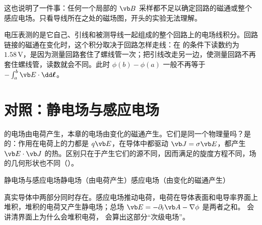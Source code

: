 这也说明了一件事：任何一个局部的 $\vb B$ 采样都不足以确定回路的磁通或整个感应电场。只看导线所在之处的磁场图，开头的实验无法理解。

\begin{pitfall}[“电压表测的就是两点之间的电势差”]
电压表测的是它自己、引线和被测导线一起组成的整个回路上的电场线积分。回路链接的磁通在变化时，这个积分取决于回路怎样走线：在 的条件下读数约为 $1.58\,\mathrm V$，是因为测量回路套住了螺线管一次；把引线改走另一边，使测量回路不再套住螺线管，读数就会不同。此时 $\phi(b)-\phi(a)$ 一般不再等于 $-\int_a^b\vb E\cdot\dd\boldsymbol\ell$。
\end{pitfall}

\section{对照：静电场与感应电场}\label{sec:magnetic-static-vs-induced}

 的电场由电荷产生，本章的电场由变化的磁通产生。它们是同一个物理量吗？是的：作用在电荷上的力都是 $q\vb E$，在导体中都驱动 $\vb J=\sigma\vb E$，都产生 $\vb E\cdot\vb J$ 的热。区别只在于产生它们的源不同，因而满足的旋度方程不同，场的几何形状也不同（）。


\begin{compare}{静电场与感应电场}{静电场（由电荷产生）}{感应电场（由变化的磁通产生）}
\end{compare}

真实导体中两部分同时存在。感应电场推动电荷，电荷在导体表面和电导率界面上堆积，堆积的电荷又产生静电场；总场 $\vb E=-\partial_t\vb A-\nabla\phi$ 是两者之和。 会讲清界面上为什么会堆积电荷， 会算出这部分“次级电场”。

